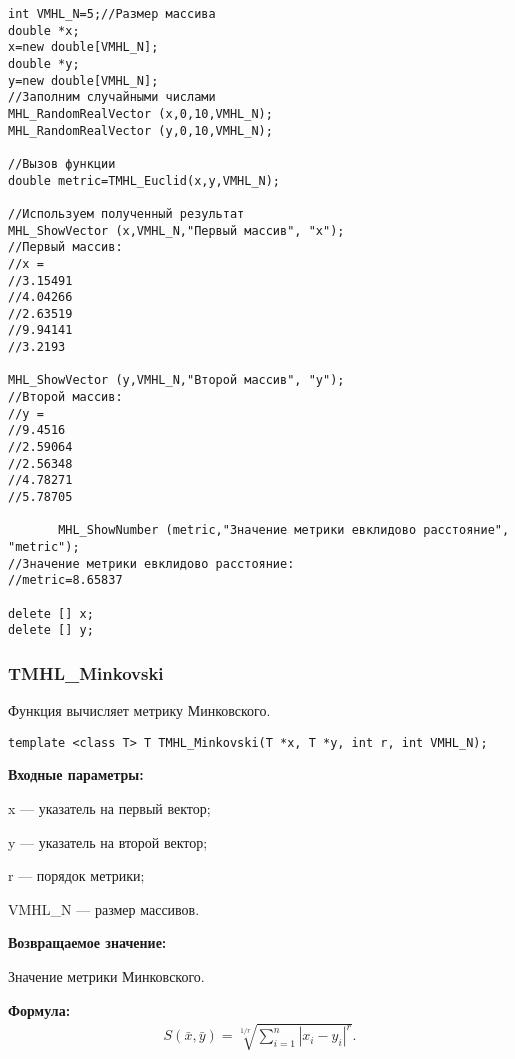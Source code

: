 \documentclass[a4paper,12pt]{article}
\begin{document}
\begin{lstlisting}[label=code_use_TMHL_Euclid,caption=Пример использования]
int VMHL_N=5;//Размер массива
double *x;
x=new double[VMHL_N];
double *y;
y=new double[VMHL_N];
//Заполним случайными числами
MHL_RandomRealVector (x,0,10,VMHL_N);
MHL_RandomRealVector (y,0,10,VMHL_N);

//Вызов функции
double metric=TMHL_Euclid(x,y,VMHL_N);

//Используем полученный результат
MHL_ShowVector (x,VMHL_N,"Первый массив", "x");
//Первый массив:
//x =	
//3.15491
//4.04266
//2.63519
//9.94141
//3.2193

MHL_ShowVector (y,VMHL_N,"Второй массив", "y");
//Второй массив:
//y =	
//9.4516
//2.59064
//2.56348
//4.78271
//5.78705

       MHL_ShowNumber (metric,"Значение метрики евклидово расстояние", "metric");
//Значение метрики евклидово расстояние:
//metric=8.65837

delete [] x;
delete [] y;
\end{lstlisting}

\subsubsection{TMHL\_Minkovski}\label{TMHL_Minkovski}

Функция вычисляет метрику Минковского.


\begin{lstlisting}[label=code_syntax_TMHL_Minkovski,caption=Синтаксис]
template <class T> T TMHL_Minkovski(T *x, T *y, int r, int VMHL_N);
\end{lstlisting}

\textbf{Входные параметры:}
 
x --- указатель на первый вектор;
 
y --- указатель на второй вектор;

r --- порядок метрики;
 
VMHL\_N --- размер массивов.

\textbf{Возвращаемое значение:}
 
Значение метрики Минковского.

\textbf{Формула:}
\begin{eqnarray*}
S\left( \bar{x}, \bar{y}\right)=\sqrt[1/r]{\sum_{i=1}^n {\left| x_i-y_i \right|}^r}   .
\end{eqnarray*}
\end{document}
